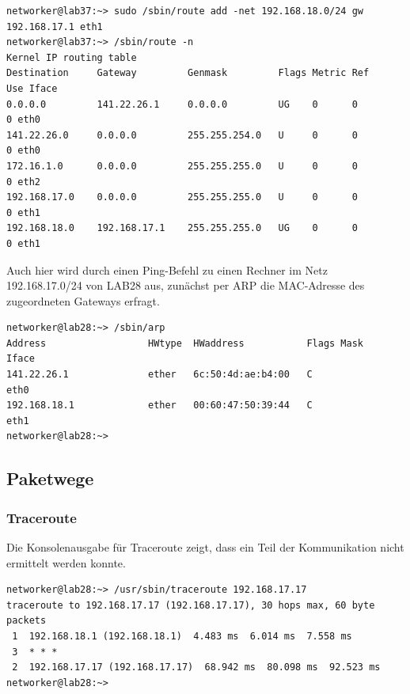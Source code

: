 \begin{lstlisting}[label=gegenStelleISDN,caption=Konfigurierte Routen auf LAB37]
networker@lab37:~> sudo /sbin/route add -net 192.168.18.0/24 gw 192.168.17.1 eth1
networker@lab37:~> /sbin/route -n
Kernel IP routing table
Destination     Gateway         Genmask         Flags Metric Ref    Use Iface
0.0.0.0         141.22.26.1     0.0.0.0         UG    0      0        0 eth0
141.22.26.0     0.0.0.0         255.255.254.0   U     0      0        0 eth0
172.16.1.0      0.0.0.0         255.255.255.0   U     0      0        0 eth2
192.168.17.0    0.0.0.0         255.255.255.0   U     0      0        0 eth1
192.168.18.0    192.168.17.1    255.255.255.0   UG    0      0        0 eth1
\end{lstlisting}
Auch hier wird durch einen Ping-Befehl zu einen Rechner im Netz 192.168.17.0/24 von LAB28 aus, zunächst per ARP die MAC-Adresse des zugeordneten Gateways erfragt. 
\begin{lstlisting}[label=arbISDN,caption=ARP auf LAB28 nach ping auf 192.168.17.17]
networker@lab28:~> /sbin/arp
Address                  HWtype  HWaddress           Flags Mask            Iface
141.22.26.1              ether   6c:50:4d:ae:b4:00   C                     eth0
192.168.18.1             ether   00:60:47:50:39:44   C                     eth1
networker@lab28:~> 
\end{lstlisting}
\subsection{Paketwege}
\subsubsection{Traceroute}
Die Konsolenausgabe für Traceroute zeigt, dass ein Teil der Kommunikation nicht ermittelt werden konnte.
\begin{lstlisting}[label=tracerouteISDN,caption=ISDN-Strecke traceroute]
networker@lab28:~> /usr/sbin/traceroute 192.168.17.17
traceroute to 192.168.17.17 (192.168.17.17), 30 hops max, 60 byte packets
 1  192.168.18.1 (192.168.18.1)  4.483 ms  6.014 ms  7.558 ms
 3  * * *
 2  192.168.17.17 (192.168.17.17)  68.942 ms  80.098 ms  92.523 ms
networker@lab28:~>
\end{lstlisting}
